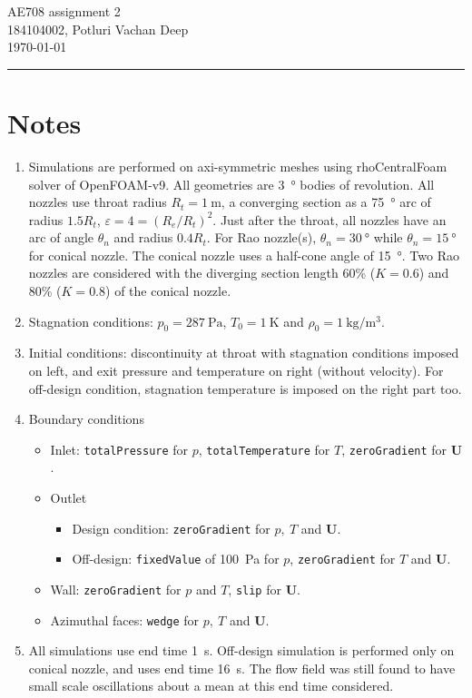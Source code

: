 \documentclass{article}
\newcommand{\vect}[1]{\ensuremath{\boldsymbol{\mathbf{#1}}}}
\begin{document}
\begin{center}
    {\Large AE708 assignment 2}\\[0.5em]
    {\large 184104002, Potluri Vachan Deep}\\[0.5em]
    {\today}
    \rule{\linewidth}{2pt}
\end{center}

\section*{Notes}
\begin{enumerate}
    \item Simulations are performed on axi-symmetric meshes using rhoCentralFoam solver of OpenFOAM-v9. All geometries are \SI{3}{\degree} bodies of revolution. All nozzles use throat radius $R_t = \SI{1}{\meter}$, a converging section as a \SI{75}{\degree} arc of radius $1.5 R_t$, $\varepsilon = 4 = (R_e/R_t)^2$. Just after the throat, all nozzles have an arc of angle $\theta_n$ and radius $0.4 R_t$. For Rao nozzle(s), $\theta_n = \SI{30}{\degree}$ while $\theta_n = \SI{15}{\degree}$ for conical nozzle. The conical nozzle uses a half-cone angle of \SI{15}{\degree}. Two Rao nozzles are considered with the diverging section length 60\% ($K=0.6$) and 80\% ($K=0.8$) of the conical nozzle.
    \item Stagnation conditions: $p_0 = \SI{287}{\pascal}$, $T_0 = \SI{1}{\kelvin}$ and $\rho_0 = \SI{1}{\kg\per\meter\cubed}$.
    \item Initial conditions: discontinuity at throat with stagnation conditions imposed on left, and exit pressure and temperature on right (without velocity). For off-design condition, stagnation temperature is imposed on the right part too.
    \item Boundary conditions
    \begin{itemize}
        \item Inlet: \texttt{totalPressure} for $p$, \texttt{totalTemperature} for $T$, \texttt{zeroGradient} for $\vect{U}$.
        \item Outlet
        \begin{itemize}
            \item Design condition: \texttt{zeroGradient} for $p,\ T$ and $\vect{U}$.
            \item Off-design: \texttt{fixedValue} of \SI{100}{\pascal} for $p$, \texttt{zeroGradient} for $T$ and $\vect{U}$.
        \end{itemize}
        \item Wall: \texttt{zeroGradient} for $p$ and $T$, \texttt{slip} for $\vect{U}$.
        \item Azimuthal faces: \texttt{wedge} for $p,\ T$ and $\vect{U}$.
    \end{itemize}
    \item All simulations use end time \SI{1}{\second}. Off-design simulation is performed only on conical nozzle, and uses end time \SI{16}{\second}. The flow field was still found to have small scale oscillations about a mean at this end time considered.
\end{enumerate}
\end{document}
